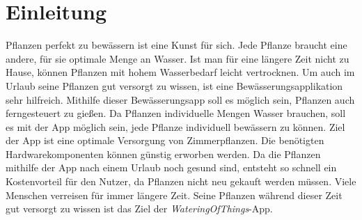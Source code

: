 \section{Einleitung}
Pflanzen perfekt zu bewässern ist eine Kunst für sich. Jede Pflanze braucht eine andere, für sie optimale Menge an Wasser. Ist man für eine längere Zeit nicht zu Hause, können Pflanzen mit hohem Wasserbedarf leicht vertrocknen. Um auch im Urlaub seine Pflanzen gut versorgt zu wissen, ist eine Bewässerungsapplikation sehr hilfreich. Mithilfe dieser Bewässerungsapp soll es möglich sein, Pflanzen auch ferngesteuert zu gießen. Da Pflanzen individuelle Mengen Wasser brauchen, soll es mit der App möglich sein, jede Pflanze individuell bewässern zu können. Ziel der App ist eine optimale Versorgung von Zimmerpflanzen. Die benötigten Hardwarekomponenten können günstig erworben werden. Da die Pflanzen mithilfe der App nach einem Urlaub noch gesund sind, entsteht so schnell ein Kostenvorteil für den Nutzer, da Pflanzen nicht neu gekauft werden müssen. Viele Menschen verreisen für immer längere Zeit. Seine Pflanzen während dieser Zeit gut versorgt zu wissen ist das Ziel der \textit{WateringOfThings}-App.